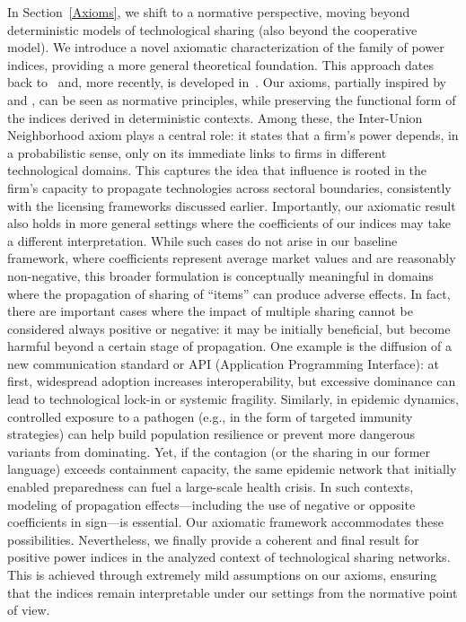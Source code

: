 \documentclass[preprint,11pt,authoryear]{elsarticle}
\theoremstyle{plain}
\begin{document}
In Section~\ref{Axioms}, we shift to a normative perspective, moving beyond deterministic models of technological sharing (also beyond the cooperative model). We introduce a novel axiomatic characterization of the family of power indices, providing a more general theoretical foundation. This approach dates back to~\citep{myerson1977graphs,owen1977values, hart1983endogenous} and, more recently, is developed in~\citep{vazquez1996owen, alonso2009values,van2015values}.  Our axioms, partially inspired by \citep{van2008characterizations} and \citep{karos2015indirect}, can be seen as normative principles, while preserving the functional form of the indices derived in deterministic contexts. Among these, the  Inter-Union Neighborhood axiom plays a central role: it states that a firm's power depends, in a probabilistic sense, only on its immediate links to firms in different technological domains. This captures the idea that influence is rooted in the firm's capacity to propagate technologies across sectoral boundaries, consistently with the licensing frameworks discussed earlier.
Importantly, our axiomatic result also holds in more general settings where the coefficients of our indices may take a different interpretation. While such cases do not arise in our baseline framework, where coefficients represent average market values and are reasonably non-negative, this broader formulation is conceptually meaningful in domains where the propagation of sharing of ``items'' can produce adverse effects.
In fact, there are important cases where the impact of multiple sharing cannot be considered always positive or negative: it may be initially beneficial, but become harmful beyond a certain stage of propagation. One example is the diffusion of a new communication standard or API (Application Programming Interface): at first, widespread adoption increases interoperability, but excessive dominance can lead to technological lock-in or systemic fragility. Similarly, in epidemic dynamics, controlled exposure to a pathogen (e.g., in the form of targeted immunity strategies) can help build population resilience or prevent more dangerous variants from dominating. Yet, if the contagion (or the sharing in our former language) exceeds containment capacity, the same epidemic network that initially enabled preparedness can fuel a large-scale health crisis.
In such contexts, modeling of propagation effects—including the use of negative or opposite coefficients in sign—is essential. Our axiomatic framework accommodates these possibilities. Nevertheless, we finally provide a coherent and final result for positive power indices in the analyzed context of technological sharing networks. This is achieved through extremely mild assumptions on our axioms, ensuring that the indices remain interpretable under our settings from the normative point of view.
\end{document}

